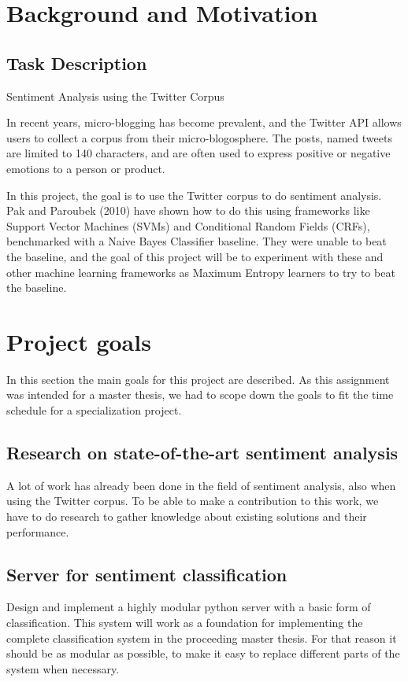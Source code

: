 \section{Background and Motivation}
	\subsection{Task Description}

\begin{center} \Large Sentiment Analysis using the Twitter Corpus \end{center}
\begin{normalsize}
In recent years, micro-blogging has become prevalent, and the Twitter API allows users to collect a corpus from their micro-blogosphere. The posts, named tweets are limited to 140 characters, and are often used to express positive or negative emotions to a person or product.

In this project, the goal is to use the Twitter corpus to do sentiment analysis. Pak and Paroubek (2010) have shown how to do this using frameworks like Support Vector Machines (SVMs) and Conditional Random Fields (CRFs), benchmarked with a Naive Bayes Classifier baseline. They were unable to beat the baseline, and the goal of this project will be to experiment with these and other machine learning frameworks as Maximum Entropy learners to try to beat the baseline.
\end{normalsize}

\section{Project goals}
In this section the main goals for this project are described. As this assignment was intended for a master thesis, we had to scope down the goals to fit the time schedule for a specialization project.

	\subsection{Research on state-of-the-art sentiment analysis}
	A lot of work has already been done in the field of sentiment analysis, also when using the Twitter corpus. To be able to make a contribution to this work, we have to do research to gather knowledge about existing solutions and their performance.

	\subsection{Server for sentiment classification}
	Design and implement a highly modular python server with a basic form of classification. This system will work as a foundation for implementing the complete classification system in the proceeding master thesis. For that reason it should be as modular as possible, to make it easy to replace different parts of the system when necessary.

